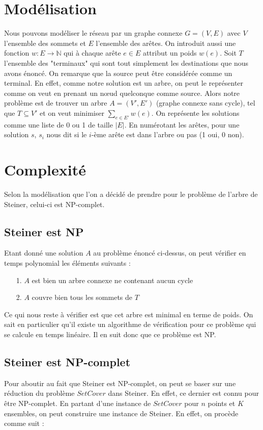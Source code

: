 \documentclass[11pt,french]{report}
\begin{document}
	\section{Modélisation\label{Modélisation}}
	Nous pouvons modéliser le réseau par un graphe connexe $G = (V, E)$ avec $V$ l'ensemble des sommets et $E$ l'ensemble des arêtes. On introduit aussi une fonction $w:E\rightarrow \mathbb{N}$ qui à chaque arête $e\in E$ attribut un poids $w(e)$. Soit $T$ l'ensemble des "terminaux" qui sont tout simplement les destinations que nous avons énoncé. On remarque que la source peut être considérée comme un terminal. En effet, comme notre solution est un arbre, on peut le représenter comme on veut en prenant un nœud quelconque comme source. Alors notre problème est de trouver un arbre $A = (V', E')$ (graphe connexe sans cycle), tel que $T\subseteq V'$ et on veut minimiser \label{poids}{$\sum_{e\in E'}w(e)$}. On représente les solutions comme une liste de 0 ou 1 de taille $|E|$. En numérotant les arêtes, pour une solution $s$, $s_i$ nous dit si le $i$-ème arête est dans l'arbre ou pas (1 oui, 0 non).
	\section{Complexité\label{Complexité}}
        Selon la modélisation que l'on a décidé de prendre pour le problème de l'arbre de Steiner, celui-ci est NP-complet.

        \subsection{Steiner est NP}
        Etant donné une solution $A$ au problème énoncé ci-dessus, on peut vérifier en temps polynomial les éléments suivants :

        \begin{itemize}
	\item[1.] $A$ est bien un arbre connexe ne contenant aucun cycle
        \item[2.] $A$ couvre bien tous les sommets de $T$
	\end{itemize}

        Ce qui nous reste à vérifier est que cet arbre est minimal en terme de poids. On sait en particulier qu'il existe un algorithme de vérification pour ce problème qui se calcule en temps linéaire. Il en suit donc que ce problème est NP.

        \subsection{Steiner est NP-complet}
        Pour aboutir au fait que Steiner est NP-complet, on peut se baser sur une réduction du problème $Set Cover$ dans Steiner. En effet, ce dernier est connu pour être NP-complet.
        En partant d'une instance de $Set Cover$ pour $n$ points et $K$ ensembles, on peut construire une instance de Steiner. En effet, on procède comme suit :
        
\end{document}
